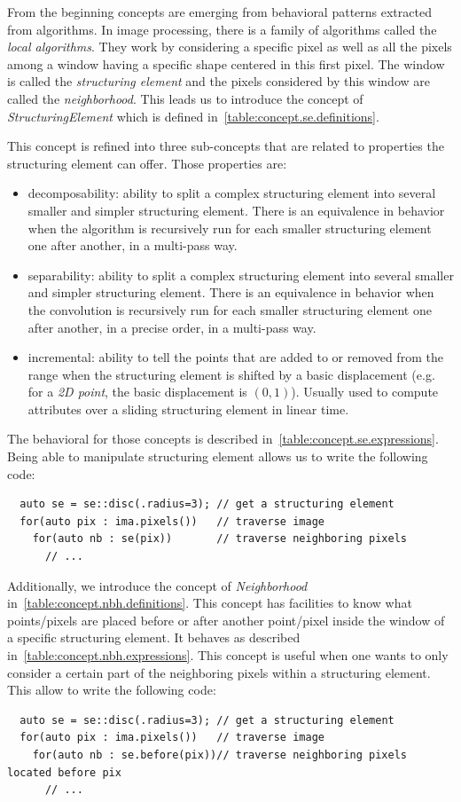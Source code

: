 From the beginning concepts are emerging from behavioral patterns extracted from algorithms. In image processing, there
is a family of algorithms called the \emph{local algorithms}. They work by considering a specific pixel as well as all
the pixels among a window having a specific shape centered in this first pixel. The window is called the
\emph{structuring element} and the pixels considered by this window are called the \emph{neighborhood}. This leads us to
introduce the concept of \emph{StructuringElement} which is defined in~\cref{table:concept.se.definitions}.

This concept is refined into three sub-concepts that are related to properties the structuring element can offer. Those
properties are:
\begin{itemize}
  \item decomposability: ability to split a complex structuring element into several smaller and simpler structuring
        element. There is an equivalence in behavior when the algorithm is recursively run for each smaller structuring
        element one after another, in a multi-pass way.
  \item separability: ability to split a complex structuring element into several smaller and simpler structuring
        element. There is an equivalence in behavior when the convolution is recursively run for each smaller
        structuring element one after another, in a precise order, in a multi-pass way.
  \item incremental: ability to tell the points that are added to or removed from the range when the structuring element
        is shifted by a basic displacement (e.g. for a \emph{2D point}, the basic displacement is $(0,1)$). Usually used
        to compute attributes over a sliding structuring element in linear time.
\end{itemize}
The behavioral for those concepts is described in~\cref{table:concept.se.expressions}. Being able to manipulate
structuring element allows us to write the following code:
\begin{verbatim}
  auto se = se::disc(.radius=3); // get a structuring element
  for(auto pix : ima.pixels())   // traverse image
    for(auto nb : se(pix))       // traverse neighboring pixels
      // ...
\end{verbatim}

Additionally, we introduce the concept of \emph{Neighborhood} in~\cref{table:concept.nbh.definitions}. This concept has
facilities to know what points/pixels are placed before or after another point/pixel inside the window of a specific
structuring element. It behaves as described in~\cref{table:concept.nbh.expressions}. This concept is useful when one
wants to only consider a certain part of the neighboring pixels within a structuring element. This allow to write the
following code:
\begin{verbatim}
  auto se = se::disc(.radius=3); // get a structuring element
  for(auto pix : ima.pixels())   // traverse image
    for(auto nb : se.before(pix))// traverse neighboring pixels located before pix
      // ...
\end{verbatim}

